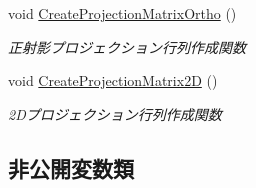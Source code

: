 \begin{DoxyCompactItemize}
void \mbox{\hyperlink{class_camera_aa649036ee18decc7c539ef7de2b0dff6}{Create\+Projection\+Matrix\+Ortho}} ()
\begin{DoxyCompactList}\small\item\em 正射影プロジェクション行列作成関数 \end{DoxyCompactList}\item 
void \mbox{\hyperlink{class_camera_a9eb4faceb2a0cf81a9ec9600de03e42d}{Create\+Projection\+Matrix2D}} ()
\begin{DoxyCompactList}\small\item\em 2\+Dプロジェクション行列作成関数 \end{DoxyCompactList}\end{DoxyCompactItemize}
\subsection*{非公開変数類}
